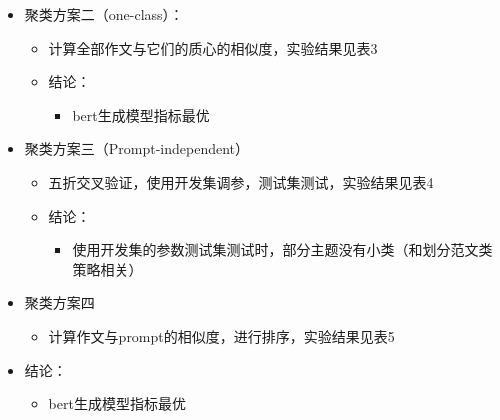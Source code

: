 \documentclass[11pt]{article}
\begin{document}
\begin{CJK}{UTF8}{gkai}
\begin{itemize}
\begin{itemize}
\begin{itemize}
\begin{itemize}
      \end{itemize}
    \end{itemize}
    \item 聚类方案二（one-class）：
    \begin{itemize}
      \item 计算全部作文与它们的质心的相似度，实验结果见表3
      \item 结论：
      \begin{itemize}
        \item bert生成模型指标最优
      \end{itemize}
    \end{itemize}
    \item 聚类方案三（Prompt-independent）
    \begin{itemize}
      \item 五折交叉验证，使用开发集调参，测试集测试，实验结果见表4
      \item 结论：
      \begin{itemize}
        \item 使用开发集的参数测试集测试时，部分主题没有小类（和划分范文类策略相关）
      \end{itemize}
    \end{itemize}
    \item 聚类方案四
    \begin{itemize}
      \item 计算作文与prompt的相似度，进行排序，实验结果见表5
    \end{itemize}
    \item 结论：
    \begin{itemize}
      \item bert生成模型指标最优
    \end{itemize}
  \end{itemize}
\end{itemize}


\end{CJK}
\end{document}
